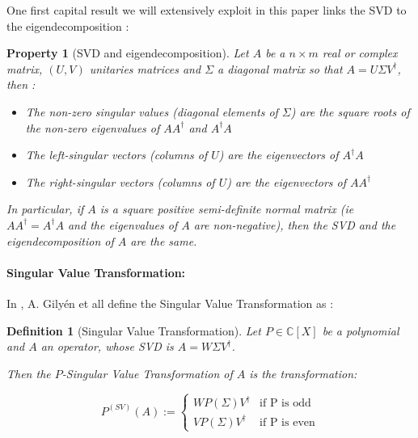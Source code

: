 \documentclass[sn-mathphys]{sn-jnl}%
\theoremstyle{thmstyleone}%
\newtheorem{propriete}[theo]{Property}
\theoremstyle{thmstyletwo}%
\theoremstyle{thmstylethree}%
\newtheorem{definition}[theo]{Definition}
\begin{document}
One first capital result we will extensively exploit in this paper
links the SVD to the eigendecomposition :

\begin{propriete}[SVD and eigendecomposition]\label{propriete:svd_eigen}
  Let $A$ be a $n\times m$ real or complex matrix, $(U,V)$ unitaries
  matrices and $\Sigma$ a diagonal matrix so that
  $A = U\Sigma V^\dagger$, then :
    \begin{itemize}
    \item The non-zero singular values (diagonal elements of $\Sigma$)
      are the square roots of the non-zero eigenvalues of $AA^\dagger$
      and $A^\dagger A$
    \item The left-singular vectors (columns of $U$) are the
      eigenvectors of $A^\dagger A$
    \item The right-singular vectors (columns of $U$) are the
      eigenvectors of $A A^\dagger$
    \end{itemize}
    
    In particular, if $A$ is a square positive semi-definite normal
    matrix (ie $AA^\dagger = A^\dagger A$ and the eigenvalues of $A$
    are non-negative), then the SVD and the eigendecomposition of $A$
    are the same.
    
\end{propriete}

\paragraph{Singular Value Transformation:}

In \cite{gilyen_su_low_wiebe_2019}, A. Gilyén et all define the
Singular Value Transformation as :

\begin{definition}[Singular Value Transformation]
  Let $P \in \mathbb{C}[X]$ be a polynomial and $A$ an operator, whose
  SVD is $A = W\Sigma V^\dagger$.

  Then the $P$-Singular Value Transformation of $A$ is the
  transformation:

\begin{equation}
        P^{(SV)}(A) := \left\{ \begin{array}{cc}
            WP(\Sigma)V^\dagger & \mbox{if P is odd} \\
            VP(\Sigma)V^\dagger & \mbox{if P is even}
        \end{array} \right.
\end{equation}

\end{definition}
\end{document}
